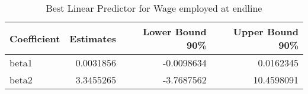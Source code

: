 \begin{table}

\caption{\label{tab:blpQempl}Best Linear Predictor for Wage employed at endline}
\centering
\begin{tabular}[t]{lrrr}
\toprule
Coefficient & Estimates & Lower Bound 90\% & Upper Bound 90\%\\
\midrule
beta1 & 0.0031856 & -0.0098634 & 0.0162345\\
beta2 & 3.3455265 & -3.7687562 & 10.4598091\\
\bottomrule
\end{tabular}
\end{table}
